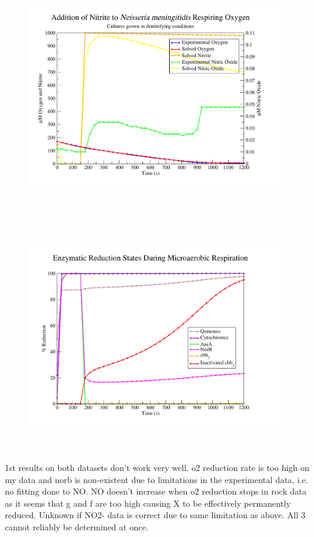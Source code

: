 \begin{figure}[t]
 \centering
 \includegraphics[height=10cm, trim=1cm 1cm 3cm 1cm, clip=true]{./07-nitritereduction/data/dataset2-1.pdf}
\end{figure}
\begin{figure}[b]
 \centering
 \includegraphics[height=10cm, trim=1cm 1cm 3cm 1cm, clip=true]{./07-nitritereduction/data/dataset2redox-1.pdf}
\end{figure}




1st results on both datasets don't work very well. o2 reduction rate is too high on my data and norb is non-existent due to limitations in the experimental data, i.e. no fitting done to NO. NO doesn't increase when o2 reduction stops in rock data as it seems that g and f are too high causing X to be effectively permanently reduced. Unknown if NO2- data is correct due to same limitation as above. All 3 cannot reliably be determined at once.

